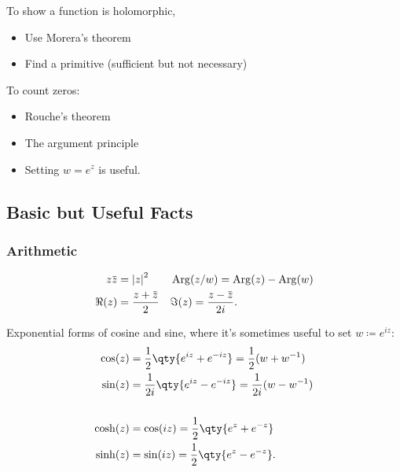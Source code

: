 \begin{fact}

To show a function is holomorphic,

\begin{itemize}
\tightlist
\item
  Use Morera's theorem
\item
  Find a primitive (sufficient but not necessary)
\end{itemize}

\end{fact}

\begin{fact}

To count zeros:

\begin{itemize}
\tightlist
\item
  Rouche's theorem
\item
  The argument principle
\end{itemize}

\end{fact}

\begin{itemize}
\tightlist
\item
  Setting \(w=e^z\) is useful.
\end{itemize}

\hypertarget{basic-but-useful-facts}{%
\subsection{Basic but Useful Facts}\label{basic-but-useful-facts}}

\hypertarget{arithmetic}{%
\subsubsection{Arithmetic}\label{arithmetic}}

\begin{fact}

\begin{align*}
z\mkern 1.5mu\overline{\mkern-1.5muz\mkern-1.5mu}\mkern 1.5mu &= {\left\lvert {z} \right\rvert}^2 && 
\operatorname{Arg}(z/w) = \operatorname{Arg}(z) - \operatorname{Arg}(w) \\
\Re(z) &= { z + \mkern 1.5mu\overline{\mkern-1.5muz\mkern-1.5mu}\mkern 1.5mu \over 2} && 
\Im(z) = {z - \mkern 1.5mu\overline{\mkern-1.5muz\mkern-1.5mu}\mkern 1.5mu \over 2i}
.\end{align*}

Exponential forms of cosine and sine, where it's sometimes useful to set
\(w\coloneqq e^{iz}\):
\begin{align*}
\cos(z) 
&= \frac 1 2 \qty{e^{iz} + e^{-iz}} = {1\over 2}(w+ w^{-1})\\
\sin(z) 
&= \frac{1}{2i}\qty{e^{iz} - e^{-iz}} = {1\over 2i}(w-w^{-1})
\\ \\
\cosh(z) 
&= \cos(iz) 
= {1\over 2}\qty{e^z + e^{-z}} \\
\sinh(z) 
&= \sin(iz) 
= {1\over 2}\qty{e^z - e^{-z}} 
.\end{align*}

\end{fact}

